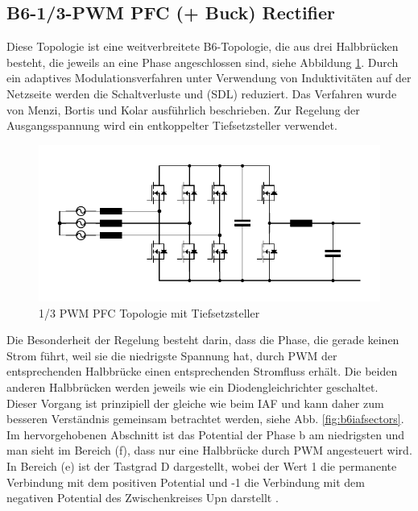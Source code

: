 	
	\subsection{B6-1/3-PWM PFC (+ Buck) Rectifier}
	\label{sec:GrundlagenB6}
	Diese Topologie ist eine weitverbreitete B6-Topologie, die aus drei Halbbrücken besteht, die jeweils an eine Phase angeschlossen sind, siehe Abbildung \ref{fig:b6buck}. Durch ein adaptives Modulationsverfahren unter Verwendung von Induktivitäten auf der Netzseite werden die Schaltverluste und  (\gls{SDL}) reduziert. Das Verfahren wurde von Menzi, Bortis und Kolar \cite{13PWMPFC} ausführlich beschrieben. Zur Regelung der Ausgangsspannung wird ein entkoppelter Tiefsetzsteller verwendet.
	\begin{figure}
		\centering
		\includegraphics[width=0.9\linewidth]{content/Grafiken/B6_Buck}
		\caption[1/3 PWM PFC Topologie mit Tiefsetzsteller]{1/3 PWM PFC Topologie mit Tiefsetzsteller}
		\label{fig:b6buck}
	\end{figure}
	Die Besonderheit der Regelung besteht darin, dass die Phase, die gerade keinen Strom führt, weil sie die niedrigste Spannung hat, durch \gls{PWM} der entsprechenden Halbbrücke einen entsprechenden Stromfluss erhält. Die beiden anderen Halbbrücken werden jeweils wie ein Diodengleichrichter geschaltet. Dieser Vorgang ist prinzipiell der gleiche wie beim \gls{IAF} und kann daher zum besseren Verständnis gemeinsam betrachtet werden, siehe Abb. \ref{fig:b6iafsectors}.
	Im hervorgehobenen Abschnitt ist das Potential der Phase b am niedrigsten und man sieht im Bereich (f), dass nur eine Halbbrücke durch \gls{PWM} angesteuert wird. In Bereich (e) ist der Tastgrad \gls{D} dargestellt, wobei der Wert 1 die permanente Verbindung mit dem positiven Potential und -1 die Verbindung mit dem negativen Potential des Zwischenkreises \gls{Upn} darstellt \cite{13PWMPFC}.\\ 
